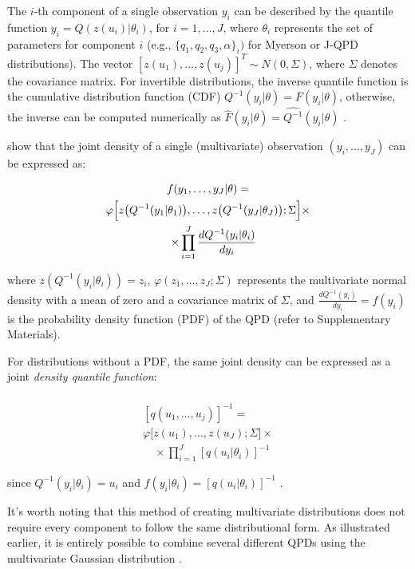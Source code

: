 \documentclass[
  fleqn,
  deca,
  blindrev
]{informs4}
\begin{document}
The \(i\)-th component of a single observation \(y_i\) can be described
by the quantile function \(y_i=Q(z(u_i)\vert\theta_i)\), for
\(i=1,\dots,J\), where \(\theta_i\) represents the set of parameters for
component \(i\) (e.g., \(\{q_1,q_2,q_3, \alpha\}_i)\) for Myerson or
J-QPD distributions). The vector
\([z(u_1),\dots,z(u_j)]^T\sim N(0,\Sigma)\), where \(\Sigma\) denotes
the covariance matrix. For invertible distributions, the inverse
quantile function is the cumulative distribution function (CDF)
\(Q^{-1}(y_i\vert\theta)=F(y_i\vert\theta)\), otherwise, the inverse can
be computed numerically as
\(\widehat{F}(y_i\vert\theta)=\widehat{Q^{-1}}(y_i\vert\theta)\)
\citep{perepolkin2023TenetsQuantilebasedInference}.

\citet{drovandi2011LikelihoodfreeBayesianEstimation} show that the joint
density of a single (multivariate) observation \((y_i,\dots,y_J)\) can
be expressed as:

\[
\begin{gathered}
f(y_1,\dots,y_J\vert\theta)=\\
\varphi\Bigl[z\bigl(Q^{-1}(y_1\vert\theta_1)\bigr),\dots,z\bigl(Q^{-1}(y_J\vert\theta_J)\bigr);\Sigma\Bigr]\times\\
\quad \times\prod_{i=1}^{J}\frac{dQ^{-1}(y_i\vert\theta_i)}{dy_i}
\end{gathered}
\]

where \(z(Q^{-1}(y_i\vert\theta_i))=z_i\),
\(\varphi(z_1,\dots,z_J;\Sigma)\) represents the multivariate normal
density with a mean of zero and a covariance matrix of \(\Sigma\), and
\(\frac{dQ^{-1}(y_i)}{dy_i}=f(y_i)\) is the probability density function
(PDF) of the QPD (refer to Supplementary Materials).

For distributions without a PDF, the same joint density can be expressed
as a joint \emph{density quantile function}:

\[
\begin{gathered}
\\
[q(u_1,\dots,u_j)]^{-1}=\\
\varphi\bigl[z(u_1),\dots,z(u_J);\Sigma\bigr]\times\\
\quad \times \prod_{i=1}^{J}[q(u_i\vert\theta_i)]^{-1}
\end{gathered}
\]

since \(Q^{-1}(y_i\vert\theta_i)=u_i\) and
\(f(y_i\vert\theta_i)=[q(u_i\vert\theta_i)]^{-1}\)
\citep{gilchrist2000StatisticalModellingQuantile}.

It's worth noting that this method of creating multivariate
distributions does not require every component to follow the same
distributional form. As illustrated earlier, it is entirely possible to
combine several different QPDs using the multivariate Gaussian
distribution \citep{drovandi2011LikelihoodfreeBayesianEstimation}.
\end{document}
